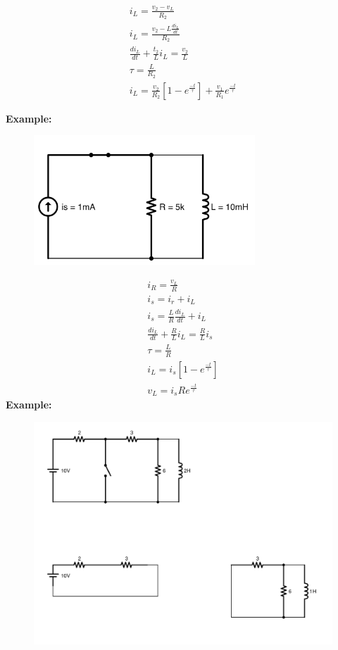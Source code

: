 \documentclass[a4paper,12]{article}
\begin{document}
    \begin{gather}
        i_L=\frac{v_2-v_L}{R_2}\\
        i_L=\frac{v_2-L\frac{di_L}{dt}}{R_2}\\
        \frac{di_L}{dt}+\frac{t_2}{L}i_L=\frac{v_2}{L}\\
        \tau=\frac{L}{R_2}\\
         i_L=\frac{v_2}{R_2}[1-e^{\frac{-t}{\tau}}]+\frac{v_1}{R_1}e^{\frac{-t}{\tau}}
        \end{gather}
      
        \textbf{Example:}
    \begin{figure}[H]
        \centering
        \includegraphics[width=83mm]{Image/24.jpeg}
    \end{figure}
    \begin{gather}
      i_R=\frac{v_L}{R}\\
      i_s=i_r+i_L\\
      i_s=\frac{L}{R}\frac{di_L}{dt}+i_L\\
      \frac{di_L}{dt}+\frac{R}{L}i_L=\frac{R}{L}i_s\\
      \tau=\frac{L}{R}\\
      i_L=i_s[1-e^{\frac{-t}{\tau}}]\\
      v_L=i_sRe^{\frac{-t}{\tau}}
    \end{gather}
    \textbf{Example:}
    \begin{figure}[H]
    \centering
    \includegraphics[width=150mm]{Image/31.jpeg}
\end{figure}
\end{document}
